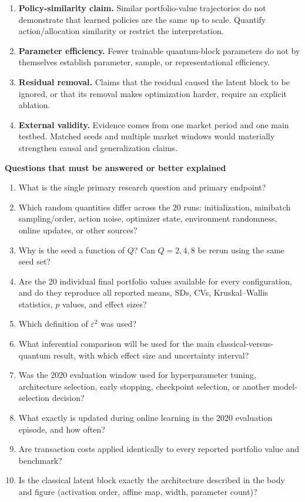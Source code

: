 \documentclass[aps,floatfix,superscriptaddress,twocolumn,tightenlines,amsmath,amssymb,nofootinbib,10pt,longbibliography,prl]{revtex4-2}
\begin{document}
\begin{tcolorbox}
\begin{enumerate}
\item \textbf{Policy-similarity claim.} Similar portfolio-value trajectories do not demonstrate that learned policies are the same up to scale. Quantify action/allocation similarity or restrict the interpretation.
\item \textbf{Parameter efficiency.} Fewer trainable quantum-block parameters do not by themselves establish parameter, sample, or representational efficiency.
\item \textbf{Residual removal.} Claims that the residual caused the latent block to be ignored, or that its removal makes optimization harder, require an explicit ablation.
\item \textbf{External validity.} Evidence comes from one market period and one main testbed. Matched seeds and multiple market windows would materially strengthen causal and generalization claims.
\end{enumerate}
\textbf{Questions that must be answered or better explained}
\begin{enumerate}
\item What is the single primary research question and primary endpoint?
\item Which random quantities differ across the 20 runs: initialization, minibatch sampling/order, action noise, optimizer state, environment randomness, online updates, or other sources?
\item Why is the seed a function of $Q$? Can $Q=2,4,8$ be rerun using the same seed set?
\item Are the 20 individual final portfolio values available for every configuration, and do they reproduce all reported means, SDs, CVs, Kruskal--Wallis statistics, $p$ values, and effect sizes?
\item Which definition of $\varepsilon^2$ was used?
\item What inferential comparison will be used for the main classical-versus-quantum result, with which effect size and uncertainty interval?
\item Was the 2020 evaluation window used for hyperparameter tuning, architecture selection, early stopping, checkpoint selection, or another model-selection decision?
\item What exactly is updated during online learning in the 2020 evaluation episode, and how often?
\item Are transaction costs applied identically to every reported portfolio value and benchmark?
\item Is the classical latent block exactly the architecture described in the body and figure (activation order, affine map, width, parameter count)?

\end{enumerate}
\end{tcolorbox}
\end{document}
